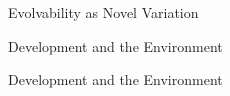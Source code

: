 \begin{frame}{Evolvability as Novel Variation}
  
\end{frame}

\begin{frame}{Development and the Environment}
  
\end{frame}

\begin{frame}{Development and the Environment}
  
\end{frame}

